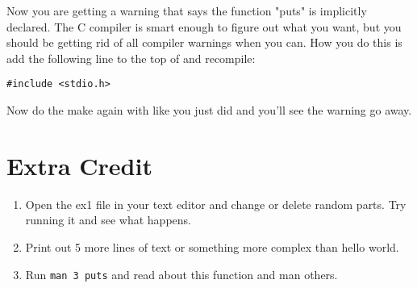 Now you are getting a warning that says the function "puts" is implicitly declared.
The C compiler is smart enough to figure out what you want, but you should be
getting rid of all compiler warnings when you can.  How you do this is add the
following line to the top of  and recompile:

\begin{lstlisting}
#include <stdio.h>
\end{lstlisting}

Now do the make again with like you just did and you'll see the warning go away.

\section{Extra Credit}

\begin{enumerate}
\item Open the ex1 file in your text editor and change or delete random parts.  Try running it and see what happens.
\item Print out 5 more lines of text or something more complex than hello world.
\item Run \verb|man 3 puts| and read about this function and man others.
\end{enumerate}


